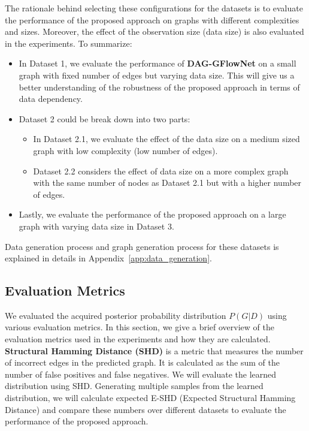 \documentclass{lxaiproposal}
\begin{document}
    The rationale behind selecting these configurations for the datasets is to evaluate the performance of the proposed
    approach on graphs with different complexities and sizes. Moreover, the effect of the observation size (data
    size) is also evaluated in the experiments. To summarize:
    \begin{itemize}
        \item In Dataset 1, we evaluate the performance of \textbf{DAG-GFlowNet} on a small graph with fixed number
        of edges but varying data size. This will give us a better understanding of the robustness of the proposed
        approach in terms of data dependency.
        \item Dataset 2 could be break down into two parts:
        \begin{itemize}
            \item In Dataset 2.1, we evaluate the effect of the data size on a medium sized graph with low complexity (low number of edges).
            \item Dataset 2.2 considers the effect of data size on a more complex graph with the same number of
            nodes as Dataset 2.1 but with a higher number of edges.
        \end{itemize}
        \item Lastly, we evaluate the performance of the proposed approach on a large graph with varying data size in
        Dataset 3.
    \end{itemize}

    Data generation process and graph generation process for these datasets is explained in details in Appendix~\ref{app:data_generation}.

    \subsection{Evaluation Metrics}
    \vspace*{-3mm}

    We evaluated the acquired posterior probability distribution $P(G|D)$ using various evaluation metrics. In this
    section, we give a brief overview of the evaluation metrics used in the experiments and how they are calculated.
    \vspace*{3mm}
    \textbf{Structural Hamming Distance (SHD)} is a metric that measures the number of incorrect edges in the
    predicted graph. It is calculated as the sum of the number of false positives and false negatives. We will
    evaluate the learned distribution using SHD. Generating multiple samples from the learned distribution,
    we will calculate expected E-SHD (Expected Structural Hamming Distance) and compare these numbers over different
    datasets to evaluate the performance of the proposed approach.
\end{document}

